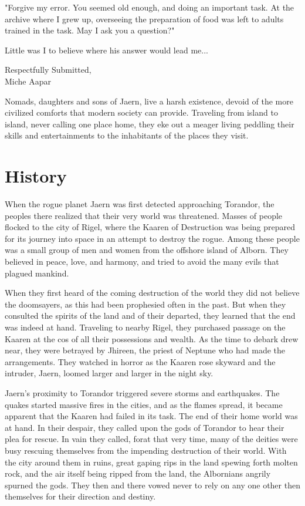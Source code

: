 "Forgive my error. You seemed old enough, and doing an important task. At the archive where I grew up, overseeing the preparation of food was left to adults trained in the task. May I ask you a question?"

Little was I to believe where his answer would lead me...

\hspace*{\fill}Respectfully Submitted,\\
\hspace*{\fill}Miche Aapar

Nomads, daughters and sons of Jaern, live a harsh existence, devoid of the more civilized comforts that modern society can provide. Traveling from island to island, never calling one place home, they eke out a meager living peddling their skills and entertainments to the inhabitants of the places they visit.

\section{History}
When the rogue planet Jaern was first detected approaching Torandor, the peoples there realized that their very world was threatened. Masses of people flocked to the city of Rigel, where the Kaaren of Destruction was being prepared for its journey into space in an attempt to destroy the rogue. Among these people was a small group of men and women from the offshore island of Alborn. They believed in peace, love, and harmony, and tried to avoid the many evils that plagued mankind.

When they first heard of the coming destruction of the world they did not believe the doomsayers, as this had been prophesied often in the past. But when they consulted the spirits of the land and of their departed, they learned that the end was indeed at hand. Traveling to nearby Rigel, they purchased passage on the Kaaren at the cos of all their possessions and wealth. As the time to debark drew near, they were betrayed by Jhireen, the priest of Neptune who had made the arrangements. They watched in horror as the Kaaren rose skyward and the intruder, Jaern, loomed larger and larger in the night sky.

Jaern's proximity to Torandor triggered severe storms and earthquakes. The quakes started massive fires in the cities, and as the flames spread, it became apparent that the Kaaren had failed in its task. The end of their home world was at hand. In their despair, they called upon the gods of Torandor to hear their plea for rescue. In vain they called, forat that very time, many of the deities were busy rescuing themselves from the impending destruction of their world. With the city around them in ruins, great gaping rips in the land spewing forth molten rock, and the air itself being ripped from the land, the Albornians angrily spurned the gods. They then and there vowed never to rely on any one other then themselves for their direction and destiny.

